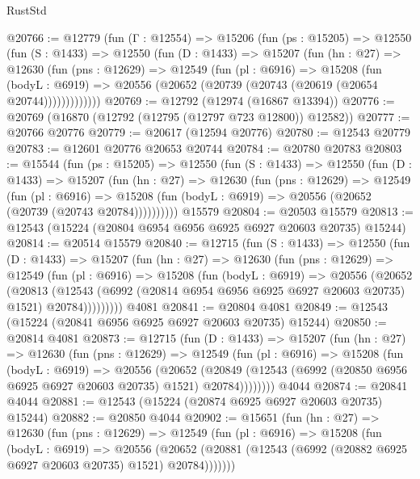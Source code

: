 \begin{lexlean}{RustStd}
\begin{coremodule}
@20766 := @12779
    (fun (Γ : @12554) =>
    @15206
      (fun (ps : @15205) =>
      @12550
        (fun (S : @1433) =>
        @12550
          (fun (D : @1433) =>
          @15207
            (fun (hn : @27) =>
            @12630
              (fun (pns : @12629) =>
              @12549
                (fun (pl : @6916) =>
                @15208
                  (fun (bodyL : @6919) =>
                  @20556 (@20652 (@20739 (@20743 (@20619 (@20654 @20744)))))))))))))
@20769 := @12792 (@12974 (@16867 @13394))
@20776 := @20769 (@16870 (@12792 (@12795 (@12797 @723 @12800)) @12582))
@20777 := @20766 @20776
@20779 := @20617 (@12594 @20776)
@20780 := @12543 @20779
@20783 := @12601 @20776 @20653 @20744
@20784 := @20780 @20783
@20803 := @15544
    (fun (ps : @15205) =>
    @12550
      (fun (S : @1433) =>
      @12550
        (fun (D : @1433) =>
        @15207
          (fun (hn : @27) =>
          @12630
            (fun (pns : @12629) =>
            @12549
              (fun (pl : @6916) =>
              @15208 (fun (bodyL : @6919) => @20556 (@20652 (@20739 (@20743 @20784))))))))))
    @15579
@20804 := @20503 @15579
@20813 := @12543 (@15224 (@20804 @6954 @6956 @6925 @6927 @20603 @20735) @15244)
@20814 := @20514 @15579
@20840 := @12715
    (fun (S : @1433) =>
    @12550
      (fun (D : @1433) =>
      @15207
        (fun (hn : @27) =>
        @12630
          (fun (pns : @12629) =>
          @12549
            (fun (pl : @6916) =>
            @15208
              (fun (bodyL : @6919) =>
              @20556
                (@20652
                  (@20813
                    (@12543
                      (@6992 (@20814 @6954 @6956 @6925 @6927 @20603 @20735) @1521)
                      @20784)))))))))
    @4081
@20841 := @20804 @4081
@20849 := @12543 (@15224 (@20841 @6956 @6925 @6927 @20603 @20735) @15244)
@20850 := @20814 @4081
@20873 := @12715
    (fun (D : @1433) =>
    @15207
      (fun (hn : @27) =>
      @12630
        (fun (pns : @12629) =>
        @12549
          (fun (pl : @6916) =>
          @15208
            (fun (bodyL : @6919) =>
            @20556
              (@20652
                (@20849
                  (@12543 (@6992 (@20850 @6956 @6925 @6927 @20603 @20735) @1521) @20784))))))))
    @4044
@20874 := @20841 @4044
@20881 := @12543 (@15224 (@20874 @6925 @6927 @20603 @20735) @15244)
@20882 := @20850 @4044
@20902 := @15651
    (fun (hn : @27) =>
    @12630
      (fun (pns : @12629) =>
      @12549
        (fun (pl : @6916) =>
        @15208
          (fun (bodyL : @6919) =>
          @20556
            (@20652 (@20881 (@12543 (@6992 (@20882 @6925 @6927 @20603 @20735) @1521) @20784)))))))

\end{coremodule}
\end{lexlean}
